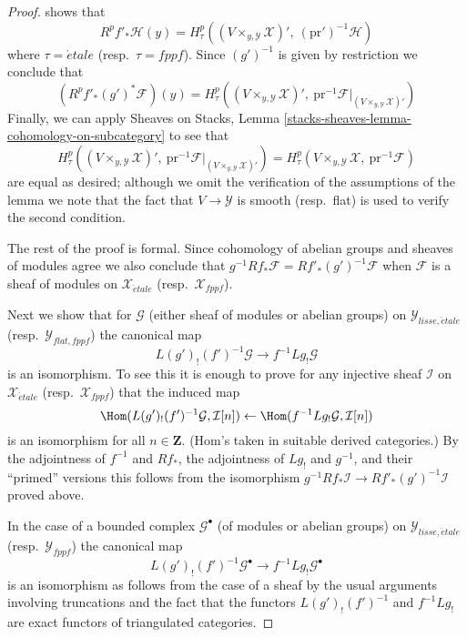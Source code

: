 \begin{proof}
shows that
\begin{equation}
\label{equation-higher-direct-image-lisse-etale}
R^pf'_*\mathcal{H}(y) =
H^p_\tau((V \times_{y, \mathcal{Y}} \mathcal{X})',
\ (\text{pr}')^{-1}\mathcal{H})
\end{equation}
where $\tau = \acute{e}tale$ (resp.\ $\tau = fppf$). Since $(g')^{-1}$
is given by restriction we conclude that
$$
\left(R^pf'_*(g')^*\mathcal{F}\right)(y) =
H^p_\tau((V \times_{y, \mathcal{Y}} \mathcal{X})',
\ \text{pr}^{-1}\mathcal{F}|_{(V \times_{y, \mathcal{Y}} \mathcal{X})'})
$$
Finally, we can apply
Sheaves on Stacks, Lemma \ref{stacks-sheaves-lemma-cohomology-on-subcategory}
to see that
$$
H^p_\tau((V \times_{y, \mathcal{Y}} \mathcal{X})',
\ \text{pr}^{-1}\mathcal{F}|_{(V \times_{y, \mathcal{Y}} \mathcal{X})'})
=
H^p_\tau(V \times_{y, \mathcal{Y}} \mathcal{X},\ \text{pr}^{-1}\mathcal{F})
$$
are equal as desired; although we omit the verification of the assumptions
of the lemma we note that the fact that $V \to \mathcal{Y}$ is smooth
(resp.\ flat) is used to verify the second condition.

\medskip\noindent
The rest of the proof is formal. Since cohomology of abelian groups and
sheaves of modules agree we also conclude that 
$g^{-1} Rf_*\mathcal{F} = Rf'_* (g')^{-1}\mathcal{F}$ when $\mathcal{F}$
is a sheaf of modules on $\mathcal{X}_{\acute{e}tale}$
(resp.\ $\mathcal{X}_{fppf}$).

\medskip\noindent
Next we show that for $\mathcal{G}$ (either sheaf of modules
or abelian groups) on
$\mathcal{Y}_{lisse,\acute{e}tale}$ (resp.\ $\mathcal{Y}_{flat,fppf}$)
the canonical map
$$
L(g')_!(f')^{-1}\mathcal{G} \to f^{-1}Lg_!\mathcal{G}
$$
is an isomorphism. To see this it is enough to prove for any
injective sheaf $\mathcal{I}$ on $\mathcal{X}_{\acute{e}tale}$
(resp.\ $\mathcal{X}_{fppf}$) that the induced map
$$
\Hom(L(g')_!(f')^{-1}\mathcal{G}, \mathcal{I}[n])
\leftarrow
\Hom(f^{-1}Lg_!\mathcal{G}, \mathcal{I}[n])
$$
is an isomorphism for all $n \in \mathbf{Z}$. (Hom's taken
in suitable derived categories.) By the adjointness of
$f^{-1}$ and $Rf_*$, the adjointness of $Lg_!$ and $g^{-1}$, and
their ``primed'' versions this follows from the isomorphism
$g^{-1} Rf_*\mathcal{I} \to Rf'_* (g')^{-1}\mathcal{I}$ proved above.

\medskip\noindent
In the case of a bounded complex $\mathcal{G}^\bullet$
(of modules or abelian groups) on
$\mathcal{Y}_{lisse,\acute{e}tale}$ (resp.\ $\mathcal{Y}_{fppf}$)
the canonical map
\begin{equation}
\label{equation-to-show}
L(g')_!(f')^{-1}\mathcal{G}^\bullet \to f^{-1}Lg_!\mathcal{G}^\bullet
\end{equation}
is an isomorphism as follows from the case of a sheaf by the usual arguments
involving truncations and the fact that the functors
$L(g')_!(f')^{-1}$ and $f^{-1}Lg_!$ are exact functors of
triangulated categories.


\end{proof}
